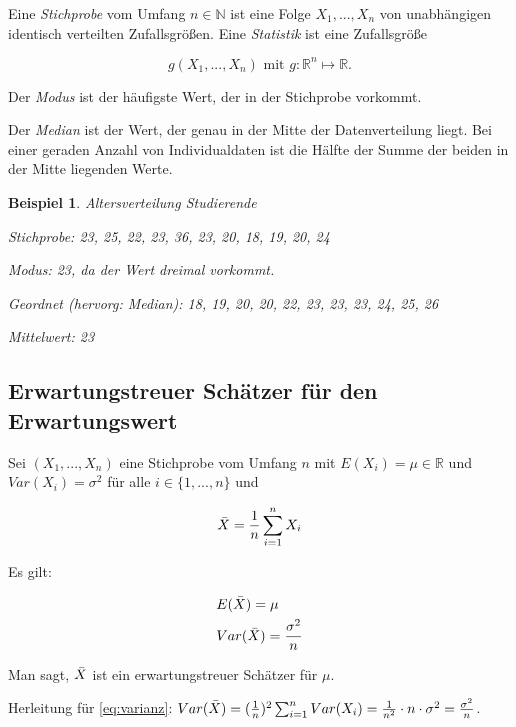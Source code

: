 \documentclass{tufte-handout}
\theoremstyle{own}
\newtheorem{example}{Beispiel}[]
\begin{document}
Eine \emph{Stichprobe} vom Umfang $n \in \mathbb{N}$ ist eine Folge $X_1,...,X_n$ von
unabhängigen identisch verteilten Zufallsgrößen. Eine \emph{Statistik} ist eine
Zufallsgröße

\begin{equation}
	g(X_1,...,X_n) \text{ mit } g: \mathbb{R}^n \mapsto \mathbb{R}.
\end{equation}

Der \emph{Modus} ist der häufigste Wert, der in der Stichprobe vorkommt.

Der \emph{Median} ist der Wert, der genau in der Mitte der Datenverteilung liegt.
Bei einer geraden Anzahl von Individualdaten ist die Hälfte der Summe der beiden
in der Mitte liegenden Werte.

\begin{example} Altersverteilung Studierende

Stichprobe: 23, 25, 22, 23, 36, 23, 20, 18, 19, 20, 24

Modus: 23, da der Wert dreimal vorkommt.

Geordnet (hervorg: Median): 18, 19, 20, 20, 22, \emph{23}, 23, 23, 24, 25, 26

Mittelwert: 23

\end{example}

\subsection{Erwartungstreuer Schätzer für den Erwartungswert}

Sei $(X_1,...,X_n)$ eine Stichprobe vom Umfang $n$ mit $E(X_i) = \mu \in \mathbb{R}$
und $Var(X_i) = \sigma^2$ für alle $i \in \{1,...,n\}$ und

\begin{equation*}
	\Bar{X} = \frac{1}{n} \sum_{i=1}^n X_i
\end{equation*}

Es gilt:

\begin{align}
&E(\Bar{X}) = \mu \\
&Var(\Bar{X}) = \frac{\sigma^2}{n} \label{eq:varianz}
\end{align}

Man sagt, $\Bar{X}$ ist ein erwartungstreuer Schätzer für $\mu$.

Herleitung für \eqref{eq:varianz}: $Var(\Bar{X}) = (\frac{1}{n})^2 \sum_{i=1}^n Var(X_i)
 = \frac{1}{n^2} \cdot n \cdot \sigma^2 = \frac{\sigma^2}{n}$.
\end{document}
